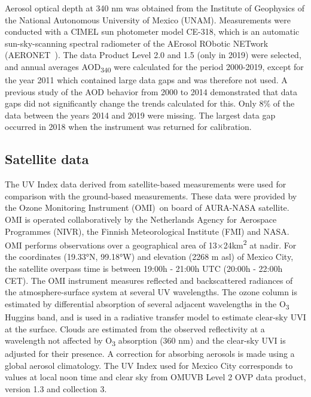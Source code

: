 \documentclass[journal=jacsat,manuscript=article]{achemso}
\begin{document}
Aerosol optical depth at 340 nm was obtained from the Institute of
Geophysics of the National Autonomous University of Mexico (UNAM).
Measurements were conducted with a CIMEL sun photometer model CE-318,
which is an automatic sun-sky-scanning spectral radiometer of
the AErosol RObotic NETwork (AERONET~\citep{Holben_1998}). The data
Product Level 2.0 and 1.5 (only in 2019) were selected, and annual
averages AOD\textsubscript{340} were calculated for the period 2000-2019,
except for the year 2011 which contained large data gaps and was therefore not used.
A previous study of the AOD behavior from 2000 to 2014 demonstrated that data gaps did not
significantly change the trends calculated for this.\citep{Carabali_2017}
Only 8\% of the data between the years 2014 and 2019 were missing.
The largest data gap occurred in 2018 when the instrument was returned for calibration.


\subsection{Satellite data}

The UV Index data derived from satellite-based measurements
were used for comparison with the ground-based measurements.
These data were provided by the Ozone Monitoring
Instrument (OMI)~on board of AURA-NASA satellite.\citep{dcio} OMI
is operated collaboratively by the Netherlands Agency for Aerospace
Programmes (NIVR), the Finnish Meteorological Institute (FMI) and NASA.
OMI performs observations over a geographical area of 13$\times$24km\textsuperscript{2} at nadir. For
the coordinates (19.33°N, 99.18°W) and elevation (2268 m asl) of Mexico City,
the satellite overpass time is between 19:00h - 21:00h UTC (20:00h - 22:00h CET).
The OMI instrument measures reflected and backscattered radiances of the atmosphere-surface system at several UV wavelengths. The ozone column is estimated by differential absorption of several adjacent
wavelengths in the O\textsubscript{3} Huggins band\citep{Veefkind_2006}, and is used in a radiative transfer model to estimate clear-sky UVI at the surface. Clouds are estimated from the observed reflectivity at a wavelength not affected by O\textsubscript{3} absorption (360 nm) and the clear-sky UVI is adjusted for their presence. A correction for absorbing aerosols is made using a global aerosol climatology.\citep{Arola_2009}
The UV Index used for Mexico City corresponds to values at local noon time and clear sky
from OMUVB Level 2 OVP data product, version 1.3 and collection 3.
\end{document}
